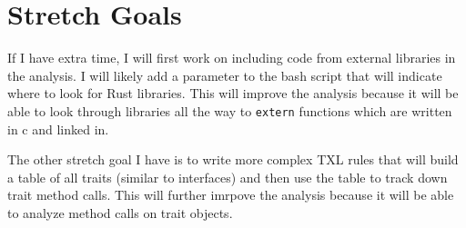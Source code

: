 \documentclass[11pt]{article}
\begin{document}
\section{Stretch Goals}
If I have extra time, I will first work on including code from external libraries in the analysis.
I will likely add a parameter to the bash script that will indicate where to look for Rust libraries.
This will improve the analysis because it will be able to look through libraries all the way to \lstinline{extern} functions which are written in c and linked in.

The other stretch goal I have is to write more complex TXL rules that will build a table of all traits (similar to interfaces) and then use the table to track down trait method calls.
This will further imrpove the analysis because it will be able to analyze method calls on trait objects.
\end{document}
